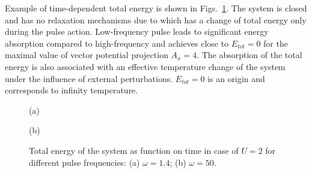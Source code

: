 Example of time-dependent total energy is shown in Figs.~\ref{fig:E_tot_time_FS}. The system is closed and has no relaxation mechanisms due to which has a change of total energy only during the pulse action. Low-frequency pulse leads to significant energy absorption compared to high-frequency and achieves close to $E_{tot}=0$ for the maximal value of vector potential projection $A_x=4$. The absorption of the total energy is also associated with an effective temperature change of the system under the influence of external perturbations. $E_{tot}=0$ is an origin and corresponds to infinity temperature.
\begin{figure}[h!]
\begin{minipage}[h]{0.5\linewidth}
 (a) \\
\end{minipage}
\hfill
\begin{minipage}[h]{0.5\linewidth}
 (b) \\
\end{minipage}
\caption{Total energy of the system as function on time in case of $U=2$ for different pulse frequencies: (a) $\omega=1.4$; (b) $\omega=50$.}
\label{fig:E_tot_time_FS}
\end{figure}

